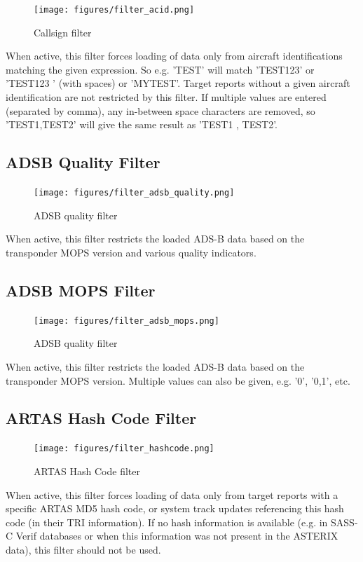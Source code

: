 \begin{figure}[H]
  \center
    \texttt{[image: figures/filter\_acid.png]}
  \caption{Callsign filter}
\end{figure}

When active, this filter forces loading of data only from aircraft identifications matching the given expression. So e.g. 'TEST' will match 'TEST123' or 'TEST123   ' (with spaces) or 'MYTEST'. Target reports without a given aircraft identification are not restricted by this filter. If multiple values are entered (separated by comma), any in-between space characters are removed, so 'TEST1,TEST2' will give the same result as 'TEST1 , TEST2'.

\subsection{ADSB Quality Filter}

\begin{figure}[H]
  \center
    \texttt{[image: figures/filter\_adsb\_quality.png]}
  \caption{ADSB quality filter}
\end{figure}

When active, this filter restricts the loaded ADS-B data based on the transponder MOPS version and various quality indicators. 

\subsection{ADSB MOPS Filter}

\begin{figure}[H]
  \center
    \texttt{[image: figures/filter\_adsb\_mops.png]}
  \caption{ADSB quality filter}
\end{figure}

When active, this filter restricts the loaded ADS-B data based on the transponder MOPS version. Multiple values can also be given, e.g. '0', '0,1', etc. 

\subsection{ARTAS Hash Code Filter}

\begin{figure}[H]
  \center
    \texttt{[image: figures/filter\_hashcode.png]}
  \caption{ARTAS Hash Code filter}
\end{figure}

When active, this filter forces loading of data only from target reports with a specific ARTAS MD5 hash code, or system track updates referencing this hash code (in their TRI information). If no hash information is available (e.g. in SASS-C Verif databases or when this information was not present in the ASTERIX data), this filter should not be used.

